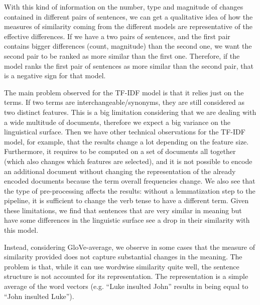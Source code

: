 With this kind of information on the number, type and magnitude of changes contained in different pairs of sentences, we can get a qualitative idea of how the measures of similarity coming from the different models are representative of the effective differences.
If we have a two pairs of sentences, and the first pair contains bigger differences (count, magnitude) than the second one, we want the second pair to be ranked as more similar than the first one.
Therefore, if the model ranks the first pair of sentences as more similar than the second pair, that is a negative sign for that model.


The main problem observed for the TF-IDF model is that it relies just on the terms. If two terms are interchangeable/synonyms, they are still considered as two distinct features. This is a big limitation considering that we are dealing with a wide multitude of documents,  %
therefore we expect a big variance on the linguistical surface.
Then we have other technical observations for the TF-IDF model, for example, that the results change a lot depending on the feature size.
Furthermore, it requires to be computed on a set of documents all together (which also changes which features are selected), and it is not possible to encode an additional document without changing the representation of the already encoded documents because the term overall frequencies change.
We also see that the type of pre-processing affects the results: without a lemmatization step to the pipeline, it is sufficient to change the verb tense to have a different term.
Given these limitations, we find that sentences that are very similar in meaning but have some differences in the linguistic surface see a drop in their similarity with this model.

Instead, considering GloVe-average, we observe in some cases that the measure of similarity provided does not capture substantial changes in the meaning. The problem is that, while it can use wordwise similarity quite well, the sentence structure is not accounted for its representation. The representation is a simple average of the word vectors (e.g. ``Luke insulted John'' results in being equal to ``John insulted Luke'').

